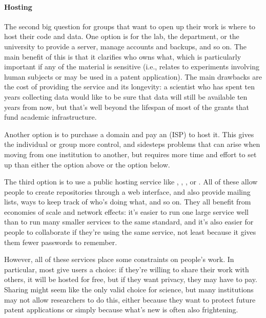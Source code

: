 \documentclass{book}
\begin{document}
\mbox{}\paragraph{Hosting}

The second big question for groups that want to open up their work is
where to host their code and data. One option is for the lab, the
department, or the university to provide a server, manage accounts and
backups, and so on. The main benefit of this is that it clarifies who
owns what, which is particularly important if any of the material is
sensitive (i.e., relates to experiments involving human subjects or may
be used in a patent application). The main drawbacks are the cost of
providing the service and its longevity: a scientist who has spent ten
years collecting data would like to be sure that data will still be
available ten years from now, but that's well beyond the lifespan of
most of the grants that fund academic infrastructure.

Another option is to purchase a domain and pay an
 (ISP) to host it. This gives
the individual or group more control, and sidesteps problems that can
arise when moving from one institution to another, but requires more
time and effort to set up than either the option above or the option
below.

The third option is to use a public hosting service like
,
,
, or
. All of these allow people to
create repositories through a web interface, and also provide mailing
lists, ways to keep track of who's doing what, and so on. They all
benefit from economies of scale and network effects: it's easier to run
one large service well than to run many smaller services to the same
standard, and it's also easier for people to collaborate if they're
using the same service, not least because it gives them fewer passwords
to remember.

However, all of these services place some constraints on people's work.
In particular, most give users a choice: if they're willing to share
their work with others, it will be hosted for free, but if they want
privacy, they may have to pay. Sharing might seem like the only valid
choice for science, but many institutions may not allow researchers to
do this, either because they want to protect future patent applications
or simply because what's new is often also frightening.
\end{document}
